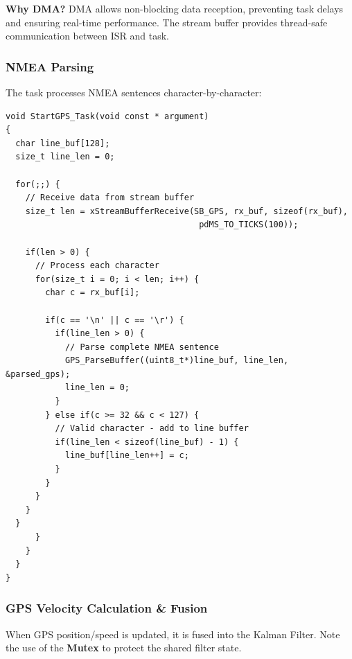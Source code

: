 \documentclass[11pt,a4paper]{article}
\begin{document}
\textbf{Why DMA?} DMA allows non-blocking data reception, preventing task delays and ensuring real-time performance. The stream buffer provides thread-safe communication between ISR and task.

\subsubsection{NMEA Parsing}
The task processes NMEA sentences character-by-character:

\begin{lstlisting}[caption=GPS NMEA Parsing, label=lst:gpsparse]
void StartGPS_Task(void const * argument)
{
  char line_buf[128];
  size_t line_len = 0;
  
  for(;;) {
    // Receive data from stream buffer
    size_t len = xStreamBufferReceive(SB_GPS, rx_buf, sizeof(rx_buf), 
                                       pdMS_TO_TICKS(100));
    
    if(len > 0) {
      // Process each character
      for(size_t i = 0; i < len; i++) {
        char c = rx_buf[i];
        
        if(c == '\n' || c == '\r') {
          if(line_len > 0) {
            // Parse complete NMEA sentence
            GPS_ParseBuffer((uint8_t*)line_buf, line_len, &parsed_gps);
            line_len = 0;
          }
        } else if(c >= 32 && c < 127) {
          // Valid character - add to line buffer
          if(line_len < sizeof(line_buf) - 1) {
            line_buf[line_len++] = c;
          }
        }
      }
    }
  }
      }
    }
  }
}
\end{lstlisting}

\subsubsection{GPS Velocity Calculation & Fusion}
When GPS position/speed is updated, it is fused into the Kalman Filter. Note the use of the \textbf{Mutex} to protect the shared filter state.
\end{document}
